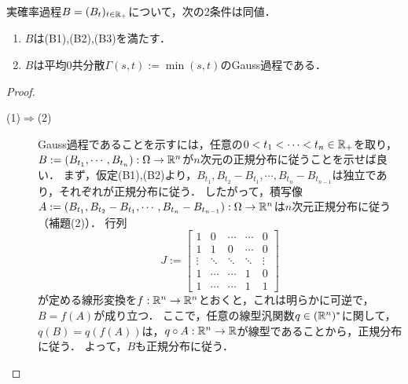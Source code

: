 \documentclass[uplatex,dvipdfmx]{jsreport}
\begin{document}
\begin{proposition}
    実確率過程$B=(B_t)_{t\in\mathbb{R}_+}$について，次の2条件は同値．
    \begin{enumerate}
        \item $B$は(B1),(B2),(B3)を満たす．
        \item $B$は平均$0$共分散$\Gamma(s,t):=\min(s,t)$のGauss過程である．
    \end{enumerate}
\end{proposition}
\begin{proof}\mbox{}
    \begin{description}
        \item[(1)$\Rightarrow$(2)] Gauss過程であることを示すには，任意の$0<t_1<\cdots<t_n\in\mathbb{R}_+$を取り，$B:=(B_{t_1},\cdots,B_{t_n}):\Omega\to\mathbb{R}^n$が$n$次元の正規分布に従うことを示せば良い．
        まず，仮定(B1),(B2)より，$B_{t_1},B_{t_2}-B_{t_1},\cdots,B_{t_n}-B_{t_{n-1}}$は独立であり，それぞれが正規分布に従う．
        したがって，積写像$A:=(B_{t_1},B_{t_2}-B_{t_1},\cdots,B_{t_n}-B_{t_{n-1}}):\Omega\to\mathbb{R}^n$は$n$次元正規分布に従う（補題(2)）．
        行列
        \[J:=\begin{bmatrix}1&0&\cdots&\cdots&0\\1&1&0&\cdots&0\\\vdots&\ddots&\ddots&\ddots&\vdots\\1&\cdots&\cdots&1&0\\1&\cdots&\cdots&1&1\end{bmatrix}\]
        が定める線形変換を$f:\mathbb{R}^n\to\mathbb{R}^n$とおくと，これは明らかに可逆で，$B=f(A)$が成り立つ．
        ここで，任意の線型汎関数$q\in(\mathbb{R}^n)^*$に関して，$q(B)=q(f(A))$は，$q\circ A:\mathbb{R}^n\to\mathbb{R}$が線型であることから，正規分布に従う．
        よって，$B$も正規分布に従う．


\end{description}
\end{proof}
\end{document}
